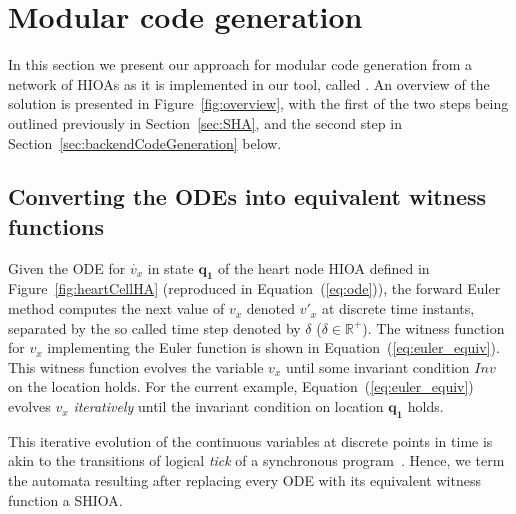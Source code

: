 \section{Modular code generation}
\label{sec:codeGen}

In this section we present our approach for modular code generation from
a network of \acp{HIOA} as it is implemented in our tool, called
\ourTool.  An overview of the solution is presented in
Figure~\ref{fig:overview}, with the first of the two steps being
outlined previously in Section~\ref{sec:SHA}, and the second step in
Section~\ref{sec:backendCodeGeneration} below.



\subsection{Converting the ODEs into equivalent witness functions}
\label{sec:converting-odes-into}

Given the \ac{ODE} for $\dot{v_x}$ in state $\mathbf{q_1}$ of the heart
node \ac{HIOA} defined in Figure~\ref{fig:heartCellHA} (reproduced in
Equation~(\ref{eq:ode})), the forward Euler method computes the next
value of $v_{x}$ denoted $v'_{x}$ at discrete time instants, separated
by the so called time step denoted by $\delta$
($\delta \in \mathbb{R}^{+}$). The witness function for $v_{x}$
implementing the Euler function is shown in
Equation~(\ref{eq:euler_equiv}). This witness function evolves the
variable $v_{x}$ until some invariant condition $Inv$ on the location
holds. For the current example, Equation~(\ref{eq:euler_equiv}) evolves
$v_{x}$ \emph{iteratively} until the invariant condition on location
$\mathbf{q_{1}}$ holds.

This iterative evolution of the continuous variables at discrete points
in time is akin to the transitions of logical \emph{tick} of a
synchronous program~\cite{benveniste03}. Hence, we term the automata
resulting after replacing every ODE with its equivalent witness function
a \acf{SHIOA}.



